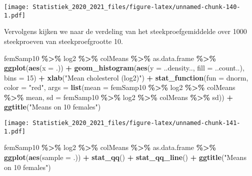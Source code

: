 \documentclass[
  12pt,dutch,coursenotes]{book}
\newenvironment{Shaded}{\begin{snugshade}}{\end{snugshade}}
\newcommand{\DataTypeTok}[1]{\textcolor[rgb]{0.13,0.29,0.53}{#1}}
\newcommand{\DecValTok}[1]{\textcolor[rgb]{0.00,0.00,0.81}{#1}}
\newcommand{\KeywordTok}[1]{\textcolor[rgb]{0.13,0.29,0.53}{\textbf{#1}}}
\newcommand{\NormalTok}[1]{#1}
\newcommand{\OperatorTok}[1]{\textcolor[rgb]{0.81,0.36,0.00}{\textbf{#1}}}
\newcommand{\StringTok}[1]{\textcolor[rgb]{0.31,0.60,0.02}{#1}}
\theoremstyle{definition}
\theoremstyle{definition}
\theoremstyle{definition}
\theoremstyle{remark}
\begin{document}
\texttt{[image: Statistiek\_2020\_2021\_files/figure-latex/unnamed-chunk-140-1.pdf]}

Vervolgens kijken we naar de verdeling van het steekproefgemiddelde over 1000 steekproeven van steekproefgrootte 10.

\begin{Shaded}
\begin{Highlighting}[]
\NormalTok{femSamp10 }\OperatorTok{\%\textgreater{}\%}\StringTok{ }\NormalTok{log2 }\OperatorTok{\%\textgreater{}\%}\StringTok{ }\NormalTok{colMeans }\OperatorTok{\%\textgreater{}\%}\StringTok{ }\NormalTok{as.data.frame }\OperatorTok{\%\textgreater{}\%}\StringTok{ }
\StringTok{    }\KeywordTok{ggplot}\NormalTok{(}\KeywordTok{aes}\NormalTok{(}\DataTypeTok{x =}\NormalTok{ .)) }\OperatorTok{+}\StringTok{ }\KeywordTok{geom\_histogram}\NormalTok{(}\KeywordTok{aes}\NormalTok{(}\DataTypeTok{y =}\NormalTok{ ..density.., }
    \DataTypeTok{fill =}\NormalTok{ ..count..), }\DataTypeTok{bins =} \DecValTok{15}\NormalTok{) }\OperatorTok{+}\StringTok{ }\KeywordTok{xlab}\NormalTok{(}\StringTok{"Mean cholesterol (log2)"}\NormalTok{) }\OperatorTok{+}\StringTok{ }
\StringTok{    }\KeywordTok{stat\_function}\NormalTok{(}\DataTypeTok{fun =}\NormalTok{ dnorm, }\DataTypeTok{color =} \StringTok{"red"}\NormalTok{, }\DataTypeTok{args =} \KeywordTok{list}\NormalTok{(}\DataTypeTok{mean =}\NormalTok{ femSamp10 }\OperatorTok{\%\textgreater{}\%}\StringTok{ }
\StringTok{        }\NormalTok{log2 }\OperatorTok{\%\textgreater{}\%}\StringTok{ }\NormalTok{colMeans }\OperatorTok{\%\textgreater{}\%}\StringTok{ }\NormalTok{mean, }\DataTypeTok{sd =}\NormalTok{ femSamp10 }\OperatorTok{\%\textgreater{}\%}\StringTok{ }
\StringTok{        }\NormalTok{log2 }\OperatorTok{\%\textgreater{}\%}\StringTok{ }\NormalTok{colMeans }\OperatorTok{\%\textgreater{}\%}\StringTok{ }\NormalTok{sd)) }\OperatorTok{+}\StringTok{ }\KeywordTok{ggtitle}\NormalTok{(}\StringTok{"Means on 10 females"}\NormalTok{)}
\end{Highlighting}
\end{Shaded}

\texttt{[image: Statistiek\_2020\_2021\_files/figure-latex/unnamed-chunk-141-1.pdf]}

\begin{Shaded}
\begin{Highlighting}[]
\NormalTok{femSamp10 }\OperatorTok{\%\textgreater{}\%}\StringTok{ }\NormalTok{log2 }\OperatorTok{\%\textgreater{}\%}\StringTok{ }\NormalTok{colMeans }\OperatorTok{\%\textgreater{}\%}\StringTok{ }\NormalTok{as.data.frame }\OperatorTok{\%\textgreater{}\%}\StringTok{ }
\StringTok{    }\KeywordTok{ggplot}\NormalTok{(}\KeywordTok{aes}\NormalTok{(}\DataTypeTok{sample =}\NormalTok{ .)) }\OperatorTok{+}\StringTok{ }\KeywordTok{stat\_qq}\NormalTok{() }\OperatorTok{+}\StringTok{ }\KeywordTok{stat\_qq\_line}\NormalTok{() }\OperatorTok{+}\StringTok{ }
\StringTok{    }\KeywordTok{ggtitle}\NormalTok{(}\StringTok{"Means on 10 females"}\NormalTok{)}
\end{Highlighting}
\end{Shaded}
\end{document}
